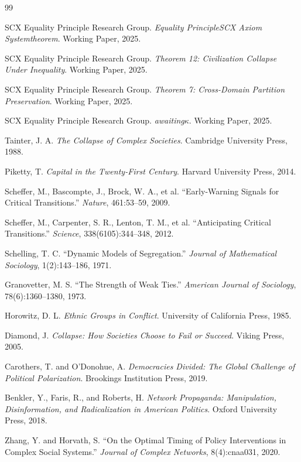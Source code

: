\documentclass[11pt,a4paper]{article}
\theoremstyle{remark}
\newcommand{\eqtheory}{Equality Principle}
\newcommand{\coupling}{\kappa}
\begin{document}
\begin{thebibliography}{99}

SCX \eqtheory{} Research Group.
\textit{Equality PrincipleSCX Axiom Systemtheorem}.
Working Paper, 2025.

SCX \eqtheory{} Research Group.
\textit{Theorem 12: Civilization Collapse Under Inequality}.
Working Paper, 2025.

SCX \eqtheory{} Research Group.
\textit{Theorem 7: Cross-Domain Partition Preservation}.
Working Paper, 2025.

SCX \eqtheory{} Research Group.
\textit{awaiting$\coupling$}.
Working Paper, 2025.

Tainter, J. A.
\textit{The Collapse of Complex Societies}.
Cambridge University Press, 1988.

Piketty, T.
\textit{Capital in the Twenty-First Century}.
Harvard University Press, 2014.

Scheffer, M., Bascompte, J., Brock, W. A., et al.
``Early-Warning Signals for Critical Transitions.''
\textit{Nature}, 461:53--59, 2009.

Scheffer, M., Carpenter, S. R., Lenton, T. M., et al.
``Anticipating Critical Transitions.''
\textit{Science}, 338(6105):344--348, 2012.

Schelling, T. C.
``Dynamic Models of Segregation.''
\textit{Journal of Mathematical Sociology}, 1(2):143--186, 1971.

Granovetter, M. S.
``The Strength of Weak Ties.''
\textit{American Journal of Sociology}, 78(6):1360--1380, 1973.

Horowitz, D. L.
\textit{Ethnic Groups in Conflict}.
University of California Press, 1985.

Diamond, J.
\textit{Collapse: How Societies Choose to Fail or Succeed}.
Viking Press, 2005.

Carothers, T. and O'Donohue, A.
\textit{Democracies Divided: The Global Challenge of Political Polarization}.
Brookings Institution Press, 2019.

Benkler, Y., Faris, R., and Roberts, H.
\textit{Network Propaganda: Manipulation, Disinformation, and Radicalization in American Politics}.
Oxford University Press, 2018.

Zhang, Y. and Horvath, S.
``On the Optimal Timing of Policy Interventions in Complex Social Systems.''
\textit{Journal of Complex Networks}, 8(4):cnaa031, 2020.


\end{thebibliography}
\end{document}
